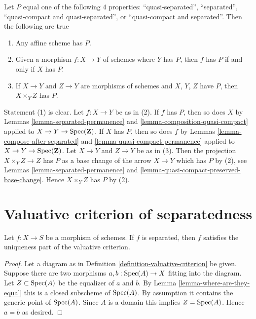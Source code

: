 \begin{remark}
\label{remark-quasi-compact-and-quasi-separated}
Let $P$ equal one of the following $4$ properties:
``quasi-separated'', ``separated'',
``quasi-compact and quasi-separated'', or ``quasi-compact and separated''.
Then the following are true
\begin{enumerate}
\item Any affine scheme has $P$.
\item Given a morphism $f : X \to Y$ of schemes where $Y$ has $P$, then
$f$ has $P$ if and only if $X$ has $P$.
\item If  $X \to Y$ and $Z \to Y$ are morphisms of schemes
and $X$, $Y$, $Z$ have $P$, then $X \times_Y Z$ has $P$.
\end{enumerate}
Statement (1) is clear.
Let $f : X \to Y$ be as in (2). If $f$ has $P$, then so does $X$
by Lemmas \ref{lemma-separated-permanence} and
\ref{lemma-composition-quasi-compact} applied to
$X \to Y \to \mathop{\mathrm{Spec}}(\mathbf{Z})$. If $X$ has $P$, then so does $f$ by
Lemmas \ref{lemma-compose-after-separated} and
\ref{lemma-quasi-compact-permanence} applied to
$X \to Y \to \mathop{\mathrm{Spec}}(\mathbf{Z})$.
Let $X \to Y$ and $Z \to Y$ be as in (3).
Then the projection $X \times_Y Z \to Z$ has $P$ as a base change of
the arrow $X \to Y$ which has $P$ by (2), see Lemmas
\ref{lemma-separated-permanence} and
\ref{lemma-quasi-compact-preserved-base-change}.
Hence $X \times_Y Z$ has $P$ by (2).
\end{remark}





\section{Valuative criterion of separatedness}
\label{section-valuative-separatedness}

\begin{lemma}
\label{lemma-separated-implies-valuative}
Let $f : X \to S$ be a morphism of schemes.
If $f$ is separated, then $f$ satisfies the uniqueness
part of the valuative criterion.
\end{lemma}

\begin{proof}
Let a diagram as in Definition \ref{definition-valuative-criterion}
be given. Suppose there are two morphisms
$a, b : \mathop{\mathrm{Spec}}(A) \to X$ fitting into the diagram.
Let $Z \subset \mathop{\mathrm{Spec}}(A)$ be the equalizer of $a$ and $b$.
By Lemma \ref{lemma-where-are-they-equal} this is a closed
subscheme of $\mathop{\mathrm{Spec}}(A)$. By assumption it contains
the generic point of $\mathop{\mathrm{Spec}}(A)$. Since $A$ is a domain
this implies $Z = \mathop{\mathrm{Spec}}(A)$. Hence $a = b$ as desired.
\end{proof}

